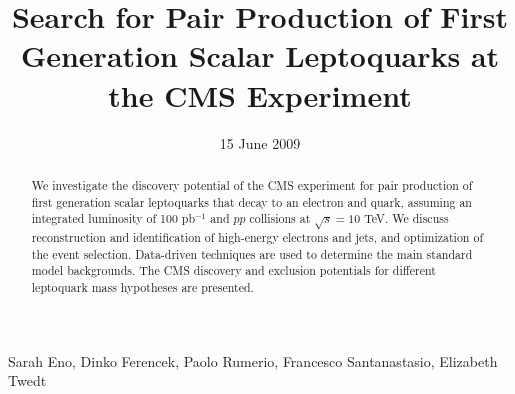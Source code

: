 
%
\begin{titlepage}

   \date{15 June 2009}


  \title{Search for Pair Production of First Generation Scalar Leptoquarks at the CMS Experiment}

  \begin{Authlist}
   Sarah Eno, Dinko Ferencek, Paolo Rumerio, Francesco Santanastasio, Elizabeth Twedt
  \end{Authlist}


  \begin{abstract}
    We investigate the discovery potential of the CMS experiment
    for pair production of first generation scalar leptoquarks that 
    decay to an electron and quark, assuming 
    an integrated luminosity of 100 pb$^{-1}$ and $pp$ collisions 
    at $\sqrt{s}=10$ TeV.
    We discuss 
    reconstruction and identification of high-energy electrons and jets, 
    and optimization of the event selection.
    Data-driven techniques are used to determine 
the main standard model backgrounds. 
The CMS discovery and exclusion potentials for different leptoquark 
mass hypotheses are presented.



%
  \end{abstract} 

\end{titlepage}


